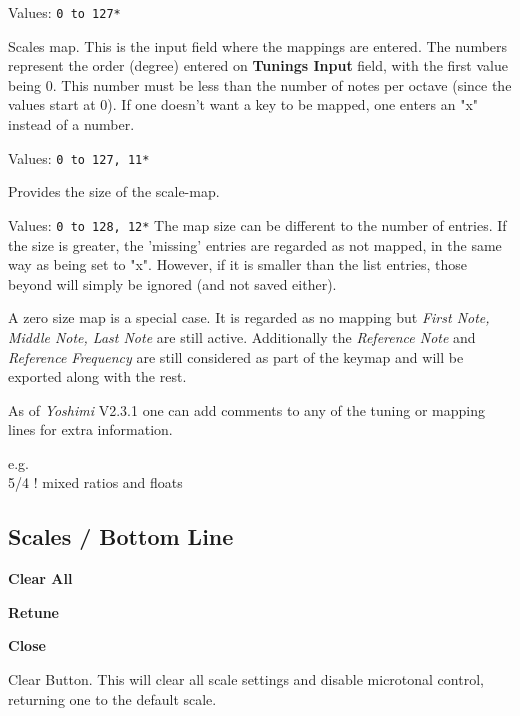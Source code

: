   Values: \texttt{0 to 127*}

   Scales map.  This is the input field where the mappings are entered.
   The numbers represent the order (degree) entered on
   \textbf{Tunings Input} field, with the first value being 0.
   This number must be less than the number of notes per octave (since
   the values start at 0).
   If one doesn't want a key to be mapped, one enters an "x" instead of a
   number.

   Values: \texttt{0 to 127, 11*}

   Provides the size of the scale-map.

   Values: \texttt{0 to 128, 12*}
   The map size can be different to the number of entries. If the size is
   greater, the 'missing' entries are regarded as not mapped, in the same way
   as being set to "x". However, if it is smaller than the list entries, those
   beyond will simply be ignored (and not saved either).

   A zero size map is a special case. It is regarded as no mapping but
   \textsl{First Note, Middle Note, Last Note} are still active. Additionally
   the \textsl{Reference Note} and \textsl{Reference Frequency} are still
   considered as part of the keymap and will be exported along with the rest.

   As of \textsl{Yoshimi} V2.3.1 one can add comments to any of the tuning or
   mapping lines for extra information.

   e.g.
   \\
   5/4 ! mixed ratios and floats

\subsection{Scales / Bottom Line}
\label{subsec:scales_bottom_line}

   \begin{enumber}
      \item \textbf{Clear All}
      \item \textbf{Retune}
      \item \textbf{Close}
   \end{enumber}

   \setcounter{ItemCounter}{0}

      Clear Button.
      This will clear all scale settings and disable microtonal control,
      returning one to the default scale.

